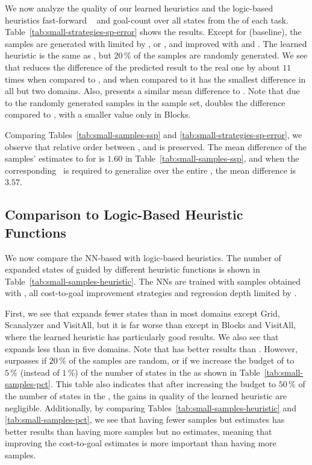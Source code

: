 We now analyze the quality of our learned heuristics and the logic-based heuristics fast-forward \hff~\cite{Hoffmann.Nebel/2001} and goal-count \hgc over all states from the \fssp of each task. Table~\ref{tab:small-strategies-sp-error} shows the results. Except for \hnnbase (baseline), the samples are generated with \bfsrw limited by , \facts or \meanfx, and improved with \hmin and \hvfc. The learned heuristic \hnnrs is the same as \hnnbfsrwl{\meanfx}, but $20\,\%$ of the samples are randomly generated. We see that \hnnbfsrwl{\meanfx} reduces the difference of the predicted result to the real one by about $11$ times when compared to \hnnbase, and when compared to \hgc it has the smallest difference in all but two domains. Also, \hnnbfsrwl{\meanfx} presents a similar mean difference to \hff. Note that due to the randomly generated samples in the sample set, \hnnrs doubles the difference compared to \hnnbfsrwl{\meanfx}, with a smaller value only in Blocks.



Comparing Tables~\ref{tab:small-samples-ssp} and \ref{tab:small-strategies-sp-error}, we observe that relative order between , \facts and \meanfx is preserved. The mean difference of the samples' estimates to \hstar for \meanfx is $1.60$ in Table~\ref{tab:small-samples-ssp}, and when the corresponding~\hnnbfsrwl{\meanfx} is required to generalize over the entire \fssp, the mean difference is $3.57$.

\subsection{Comparison to Logic-Based Heuristic Functions}

We now compare the NN-based \hnn with logic-based heuristics. The number of expanded states of \gbfs guided by different heuristic functions is shown in Table~\ref{tab:small-samples-heuristic}. The NNs are trained with samples obtained with \bfsrw, all cost-to-goal improvement strategies and regression depth limited by \meanfx.  

First, we see that \hnnbase expands fewer states than \hgc in most domains except Grid, Scanalyzer and VisitAll, but it is far worse than \hff except in Blocks and VisitAll, where the learned heuristic has particularly good results. We also see that \hnnbfsrwl{\meanfx} expands less than \hnnbase in five domains. Note that \hff has better results than \hnnbfsrwl{\meanfx}. However, \hnnbfsrwl{\meanfx} surpasses \hff if $20\,\%$ of the samples are random, or if we increase the budget of \hnnbfsrwl{\meanfx} to $5\,\%$ (instead of $1\,\%$) of the number of states in the \fssp as shown in Table~\ref{tab:small-samples-pct}. This table also indicates that after increasing the budget to $50\,\%$ of the number of states in the \fssp, the gains in quality of the learned heuristic are negligible. Additionally, by comparing Tables~\ref{tab:small-samples-heuristic} and \ref{tab:small-samples-pct}, we see that having fewer samples but \hstar estimates has better results than having more samples but no \hstar estimates, meaning that improving the cost-to-goal estimates is more important than having more samples.

